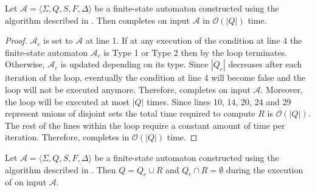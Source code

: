 \begin{proposition}\label{prop:thompson_sep_2}
  Let $\mathcal{A} = \langle \Sigma, Q, S, F, \Delta \rangle$ be a finite-state
  automaton constructed using the algorithm described in . Then
   completes on input $\mathcal{A}$ in
  $\mathcal{O}(|Q|)$ time.
\end{proposition}

\begin{proof}
  $\mathcal{A}_c$ is set to $\mathcal{A}$ at line 1. If at any execution of
  the condition at line 4 the finite-state automaton $\mathcal{A}_c$
  is Type 1 or Type 2 then by  the loop
  terminates. Otherwise, $\mathcal{A}_c$ is updated depending on its type.
  Since $|Q_c|$ decreases after each iteration of the loop, eventually the
  condition at line 4 will become false and the loop will not be executed
  anymore. Therefore,  completes on
  input $\mathcal{A}$. Moreover, the loop will be executed at most $|Q|$
  times. Since lines 10, 14, 20, 24 and 29 represent unions of disjoint sets
  the total time required to compute $R$ is $\mathcal{O}(|Q|)$. The rest of
  the lines within the loop require a constant amount of time per iteration.
  Therefore,  completes in
  $\mathcal{O}(|Q|)$ time.
\end{proof}

\begin{proposition}\label{prop:thompson_sep_3}
  Let $\mathcal{A} = \langle \Sigma, Q, S, F, \Delta \rangle$ be a finite-state
  automaton constructed using the algorithm described in . Then $Q
  = Q_c \cup R$ and $Q_c \cap R = \emptyset$ during the execution of
   on input $\mathcal{A}$.
\end{proposition}

